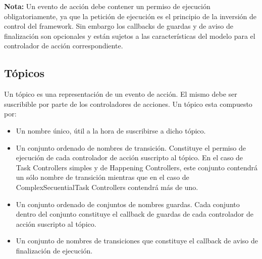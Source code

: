\begin{framed}
\textbf{Nota:} Un evento de acción debe contener un permiso de ejecución
obligatoriamente, ya que la petición de ejecución es el principio de la
inversión de control del framework. Sin embargo los callbacks de guardas y de
aviso de finalización son opcionales y están sujetos a las características del
modelo para el controlador de acción correspondiente.
\end{framed}

\subsection{Tópicos}
Un tópico es una representación de un evento de acción. El mismo debe ser
suscribible por parte de los controladores de acciones. Un tópico esta compuesto
por:
\begin{itemize}
  \item Un nombre único, útil a la hora de suscribirse a dicho tópico.
  \item Un conjunto ordenado de nombres de transición. Constituye el permiso
  de ejecución de cada controlador de acción suscripto al tópico. En el caso de
  Task Controllers simples y de Happening Controllers, este conjunto contendrá
  un sólo nombre de transición mientras que en el caso de ComplexSecuentialTask
  Controllers contendrá más de uno.
  \item Un conjunto ordenado de conjuntos de nombres guardas. Cada conjunto
  dentro del conjunto constituye el callback de guardas de cada controlador de
  acción suscripto al tópico.
  \item Un conjunto de nombres de transiciones que constituye el callback de
  aviso de finalización de ejecución.
\end{itemize}

